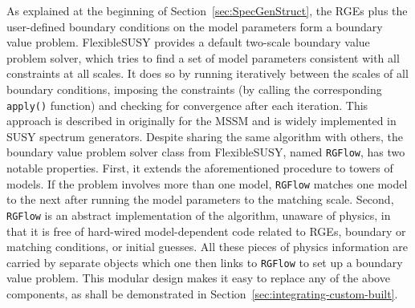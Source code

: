\documentclass[final,3p,11pt,pdflatex]{elsarticle}
\makeatletter
\newcommand{\fs}{FlexibleSUSY\@\xspace}
\newcommand{\code}[1]{\lstinline|#1|}  %
\newcommand{\secref}[1]{Section~\ref{#1}}
\makeatother
\begin{document}
As explained at the beginning of \secref{sec:SpecGenStruct}, the RGEs
plus the user-defined boundary conditions on the model parameters form
a boundary value problem.  \fs provides a default two-scale boundary
value problem solver, which tries to find a set of model parameters
consistent with all constraints at all scales.  It does so by running
iteratively between the scales of all boundary conditions, imposing
the constraints (by calling the corresponding \code{apply()} function)
and checking for convergence after each iteration.  This approach is
described in \cite{Barger:1993gh} originally for the MSSM and is widely
implemented in SUSY spectrum generators.
Despite sharing the same algorithm with others,
the boundary value problem solver class from \fs, named \code{RGFlow},
has two notable properties.
First, it extends the aforementioned procedure to towers of models.
If the problem involves more than one model,
\code{RGFlow} matches one model to the next after
running the model parameters to the matching scale.
Second, \code{RGFlow} is an abstract implementation of
the algorithm, unaware of physics, in that
it is free of hard-wired model-dependent code related to
RGEs, boundary or matching conditions, or initial guesses.
All these pieces of physics information are
carried by separate objects which one then
links to \code{RGFlow} to set up a boundary value problem.
This modular design makes it easy
to replace any of the above components,
as shall be demonstrated in \secref{sec:integrating-custom-built}.
\end{document}
